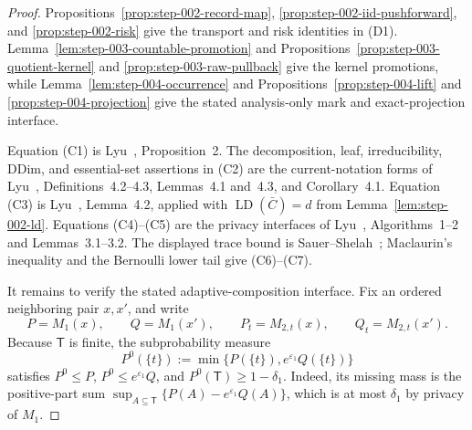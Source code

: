 \begin{proof}
Propositions~\ref{prop:step-002-record-map},
\ref{prop:step-002-iid-pushforward}, and
\ref{prop:step-002-risk} give the transport and risk identities in (D1).
Lemma~\ref{lem:step-003-countable-promotion} and
Propositions~\ref{prop:step-003-quotient-kernel} and
\ref{prop:step-003-raw-pullback} give the kernel promotions, while
Lemma~\ref{lem:step-004-occurrence} and
Propositions~\ref{prop:step-004-lift} and
\ref{prop:step-004-projection} give the stated analysis-only mark and
exact-projection interface.

Equation (C1) is Lyu~\citep{lyu2025}, Proposition~2. The decomposition,
leaf, irreducibility, DDim, and essential-set assertions in (C2) are the
current-notation forms of Lyu~\citep{lyu2025}, Definitions~4.2--4.3,
Lemmas~4.1 and~4.3, and Corollary~4.1. Equation (C3) is Lyu~\citep{lyu2025},
Lemma~4.2, applied with \(\operatorname{LD}(\bar C)=d\) from
Lemma~\ref{lem:step-002-ld}. Equations (C4)--(C5) are the privacy
interfaces of Lyu~\citep{lyu2025}, Algorithms~1--2 and Lemmas~3.1--3.2.
The displayed trace bound is Sauer--Shelah~\citep{sauer1972}; Maclaurin's
inequality and the Bernoulli lower tail give (C6)--(C7).

It remains to verify the stated adaptive-composition interface. Fix an
ordered neighboring pair \(x,x'\), and write
\[
 P=M_1(x),\qquad Q=M_1(x'),\qquad
 P_t=M_{2,t}(x),\qquad Q_t=M_{2,t}(x').
\]
Because \(\mathsf T\) is finite, the subprobability measure
\[
 P^0(\{t\}):=\min\{P(\{t\}),e^{\varepsilon_1}Q(\{t\})\}
\]
satisfies \(P^0\le P\), \(P^0\le e^{\varepsilon_1}Q\), and
\(P^0(\mathsf T)\ge1-\delta_1\). Indeed, its missing mass is the
positive-part sum
\(\sup_{A\subseteq\mathsf T}\{P(A)-e^{\varepsilon_1}Q(A)\}\), which is at
most \(\delta_1\) by privacy of \(M_1\).


\end{proof}
